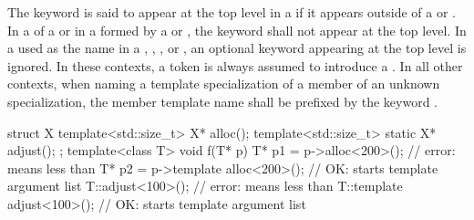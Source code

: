 \pnum
The keyword  is said to appear at the top level in
a 
if it appears outside of a  or
.
In a  of a  or
in a  formed by a  or
,
the keyword  shall not appear at the top level.
In a  used as the name in a
,
,
, or
,
an optional keyword  appearing at the top level is ignored.
In these contexts, a \tcode{<} token is always assumed to introduce a
.
In all other contexts, when naming a template specialization of
a member of an unknown specialization,
the member template name shall be prefixed by the keyword .
\begin{example}
\begin{codeblock}
struct X {
  template<std::size_t> X* alloc();
  template<std::size_t> static X* adjust();
};
template<class T> void f(T* p) {
  T* p1 = p->alloc<200>();              // error: \tcode{<} means less than
  T* p2 = p->template alloc<200>();     // OK: \tcode{<} starts template argument list
  T::adjust<100>();                     // error: \tcode{<} means less than
  T::template adjust<100>();            // OK: \tcode{<} starts template argument list
}
\end{codeblock}
\end{example}


